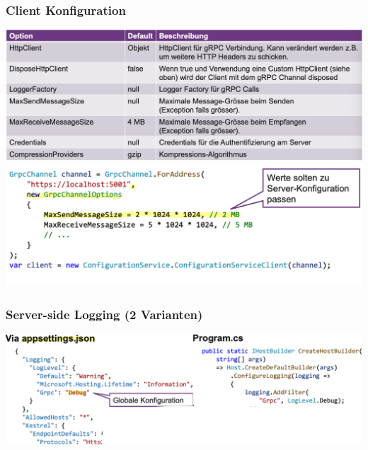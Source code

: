\subsubsection{Client Konfiguration}
\begin{center}
    \includegraphics[scale=.28]{graphic/gprc/Client Konfiguration1.png}
    \includegraphics[scale=.4]{graphic/gprc/Client Konfiguration2.png}
\end{center}
\vspace{-8pt}

\subsubsection{Server-side Logging (2 Varianten)}
\begin{center}
    \includegraphics[scale=.38]{graphic/gprc/log.png}
\end{center}
\vspace{-8pt}


\newpage